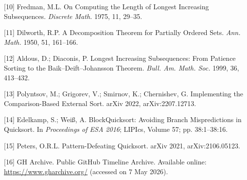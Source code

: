 \documentclass[10pt]{article}
\begin{document}
{[}10{]} Fredman, M.L. On Computing the Length of Longest Increasing Subsequences. \emph{Discrete Math.} 1975, 11, 29--35.

{[}11{]} Dilworth, R.P. A Decomposition Theorem for Partially Ordered Sets. \emph{Ann. Math.} 1950, 51, 161--166.

{[}12{]} Aldous, D.; Diaconis, P. Longest Increasing Subsequences: From Patience Sorting to the Baik--Deift--Johansson Theorem. \emph{Bull. Am. Math. Soc.} 1999, 36, 413--432.

{[}13{]} Polyntsov, M.; Grigorev, V.; Smirnov, K.; Chernishev, G. Implementing the Comparison-Based External Sort. arXiv 2022, arXiv:2207.12713.

{[}14{]} Edelkamp, S.; Weiß, A. BlockQuicksort: Avoiding Branch Mispredictions in Quicksort. In \emph{Proceedings of ESA 2016}; LIPIcs, Volume 57; pp. 38:1--38:16.

{[}15{]} Peters, O.R.L. Pattern-Defeating Quicksort. arXiv 2021, arXiv:2106.05123.

{[}16{]} GH Archive. Public GitHub Timeline Archive. Available online: \url{https://www.gharchive.org/} (accessed on 7 May 2026).
\end{document}
